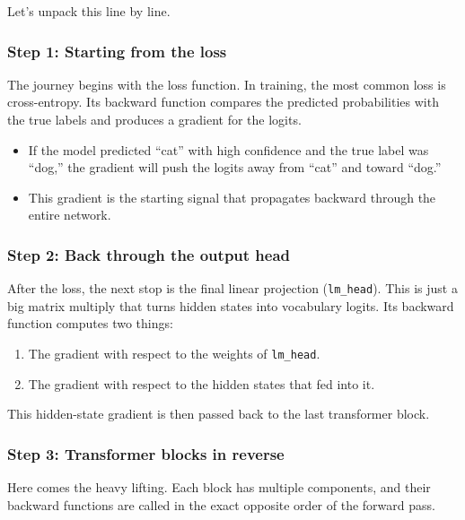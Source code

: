 \documentclass[
  letterpaper,
  DIV=11,
  numbers=noendperiod]{scrreprt}
\providecommand{\tightlist}{%
  \setlength{\itemsep}{0pt}\setlength{\parskip}{0pt}}
\begin{document}
Let's unpack this line by line.

\subsubsection{Step 1: Starting from the
loss}\label{step-1-starting-from-the-loss}

The journey begins with the loss function. In training, the most common
loss is cross-entropy. Its backward function compares the predicted
probabilities with the true labels and produces a gradient for the
logits.

\begin{itemize}
\tightlist
\item
  If the model predicted ``cat'' with high confidence and the true label
  was ``dog,'' the gradient will push the logits away from ``cat'' and
  toward ``dog.''
\item
  This gradient is the starting signal that propagates backward through
  the entire network.
\end{itemize}

\subsubsection{Step 2: Back through the output
head}\label{step-2-back-through-the-output-head}

After the loss, the next stop is the final linear projection
(\texttt{lm\_head}). This is just a big matrix multiply that turns
hidden states into vocabulary logits. Its backward function computes two
things:

\begin{enumerate}
\def\labelenumi{\arabic{enumi}.}
\tightlist
\item
  The gradient with respect to the weights of \texttt{lm\_head}.
\item
  The gradient with respect to the hidden states that fed into it.
\end{enumerate}

This hidden-state gradient is then passed back to the last transformer
block.

\subsubsection{Step 3: Transformer blocks in
reverse}\label{step-3-transformer-blocks-in-reverse}

Here comes the heavy lifting. Each block has multiple components, and
their backward functions are called in the exact opposite order of the
forward pass.
\end{document}
